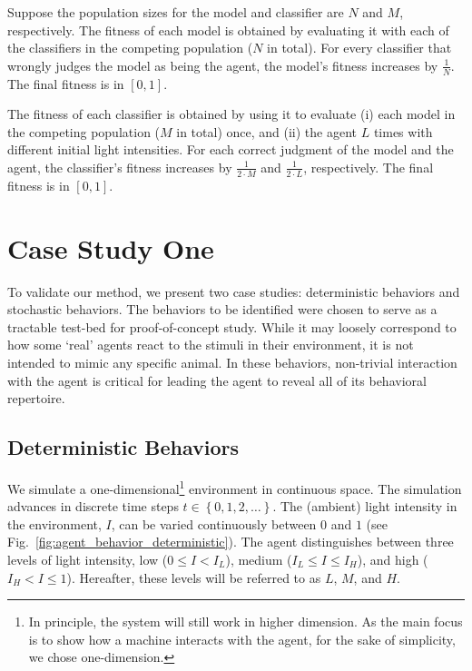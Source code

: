 Suppose the population sizes for the model and classifier are $N$ and $M$, respectively. The fitness of each model is obtained by evaluating it with each of the classifiers in the competing population ($N$ in total). For every classifier that wrongly judges the model as being the agent, the model's fitness increases by $\frac{1}{N}$. The final fitness is in $[0,1]$.

The fitness of each classifier is obtained by using it to evaluate (i) each model in the competing population ($M$ in total) once, and (ii) the agent $L$ times with different initial light intensities. For each correct judgment of the model and the agent, the classifier's fitness increases by $\frac{1}{2 \cdot M}$ and $\frac{1}{2 \cdot L}$, respectively. The final fitness is in $[0,1]$.


\section{Case Study One}\label{sec:case_studies_interaction_deterministic}

To validate our method, we present two case studies: deterministic behaviors and stochastic behaviors. The behaviors to be identified were chosen to serve as a tractable test-bed for proof-of-concept study. While it may loosely correspond to how some `real' agents react to the stimuli in their environment, it is not intended to mimic any specific animal. In these behaviors, non-trivial interaction with the agent is critical for leading the agent to reveal all of its behavioral repertoire. 

\subsection{Deterministic Behaviors}\label{sec:deterministic_behavior_interaction}

We simulate a one-dimensional\footnote{In principle, the system will still work in higher dimension. As the main focus is to show how a machine interacts with the agent, for the sake of simplicity, we chose one-dimension.} environment in continuous space. The simulation advances in discrete time steps $t \in\left\{0,1,2,\dots\right\}$. The (ambient) light intensity in the environment, $I$, can be varied continuously between $0$ and $1$ (see Fig.~\ref{fig:agent_behavior_deterministic}). The agent distinguishes between three levels of light intensity, low ($0 \leq I < I_L$), medium ($I_L \leq I \leq I_H$), and high ($I_H < I \leq 1$). Hereafter, these levels will be referred to as $L$, $M$, and $H$.

